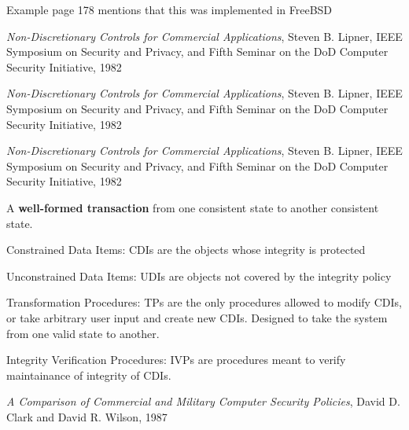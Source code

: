 \documentclass[Screen16to9,17pt]{foils}
\begin{document}

Example page 178 mentions that this was implemented in FreeBSD




\emph{Non-Discretionary Controls for Commercial Applications}, Steven B. Lipner, IEEE Symposium on Security and Privacy, and Fifth Seminar on the DoD Computer Security Initiative, 1982



\emph{Non-Discretionary Controls for Commercial Applications}, Steven B. Lipner, IEEE Symposium on Security and Privacy, and Fifth Seminar on the DoD Computer Security Initiative, 1982



\emph{Non-Discretionary Controls for Commercial Applications}, Steven B. Lipner, IEEE Symposium on Security and Privacy, and Fifth Seminar on the DoD Computer Security Initiative, 1982





A {\bf well-formed transaction} from one consistent state to another consistent state.

\begin{list2}
\item Constrained Data Items: CDIs are the objects whose
integrity is protected
\item Unconstrained Data Items: UDIs are objects not covered by
the integrity policy
\item Transformation Procedures: TPs are the only procedures
allowed to modify CDIs, or take arbitrary user input and
create new CDIs. Designed to take the system from one valid
state to another.
\item Integrity Verification Procedures: IVPs are procedures
meant to verify maintainance of integrity of CDIs.
\end{list2}

\emph{A Comparison of Commercial and Military Computer Security Policies},
David D. Clark and David R. Wilson, 1987
\end{document}
